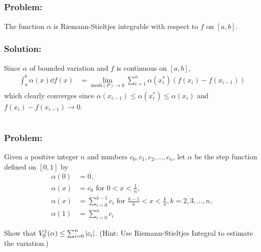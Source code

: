 \documentclass[]{article}
\begin{document}
\subsection{}
\subsubsection*{Problem:}
The function $\alpha$ is Riemann-Stieltjes integrable with respect to $f$ on $[a,b]$.

\subsubsection*{Solution:}
Since $\alpha$ of bounded variation and $f$ is continuous on $[a,b]$, \begin{align*}
    \int_{a}^{b} \alpha(x) \dd{f(x)}
        &= \lim_{\text{mesh}(P)\to 0} \sum_{i=1}^{n} \alpha(x_i^*) (f(x_i) - f(x_{i-1}))
\end{align*}
which clearly converges since $\alpha(x_{i-1}) \leq \alpha(x_i^*) \leq \alpha(x_{i})$ and $f(x_i) - f(x_{i-1}) \to 0$.

\newpage
\section{}
\subsubsection*{Problem:}
Given a positive integer $n$ and numbers $c_0, c_1, c_2, \dots, c_n$, let $\alpha$ be the step function defined on $[0,1]$ by \begin{align*}
    \alpha(0) &= 0,\\
    \alpha(x) &= c_0 \text{ for } 0 < x < \frac{1}{n},\\
    \alpha(x) &= \sum_{i=0}^{k-1} c_i \text{ for } \frac{k-1}{n} < x < \frac{k}{n}, k = 2, 3, \dots, n,\\
    \alpha(1) &= \sum_{i=0}^{n} c_i
\end{align*}

Show that $V_{0}^{1}(\alpha) \leq \sum_{i=0}^{n} \abs{c_i}$. 
(Hint: Use Riemann-Stieltjes Integral to estimate the variation.)
\end{document}
